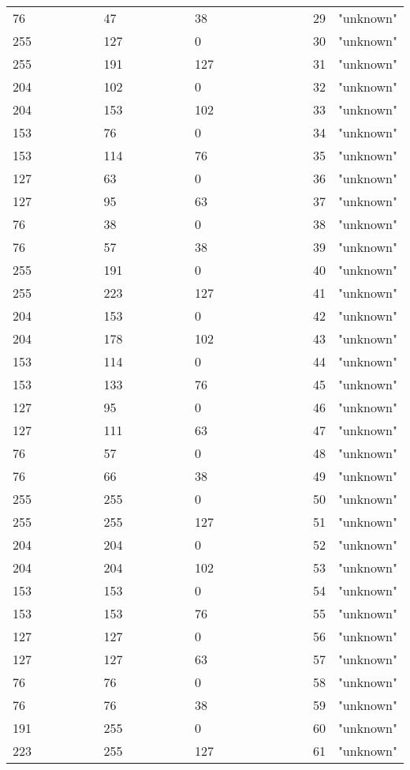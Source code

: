 \begin{longtable}{p{0.3\linewidth} p{0.3\linewidth} p{0.4\linewidth}}
 76 &   47 &   38 &   29 &  "unknown"\\
255 &  127 &    0 &   30 &  "unknown"\\
255 &  191 &  127 &   31 &  "unknown"\\
204 &  102 &    0 &   32 &  "unknown"\\
204 &  153 &  102 &   33 &  "unknown"\\
153 &   76 &    0 &   34 &  "unknown"\\
153 &  114 &   76 &   35 &  "unknown"\\
127 &   63 &    0 &   36 &  "unknown"\\
127 &   95 &   63 &   37 &  "unknown"\\
 76 &   38 &    0 &   38 &  "unknown"\\
 76 &   57 &   38 &   39 &  "unknown"\\
255 &  191 &    0 &   40 &  "unknown"\\
255 &  223 &  127 &   41 &  "unknown"\\
204 &  153 &    0 &   42 &  "unknown"\\
204 &  178 &  102 &   43 &  "unknown"\\
153 &  114 &    0 &   44 &  "unknown"\\
153 &  133 &   76 &   45 &  "unknown"\\
127 &   95 &    0 &   46 &  "unknown"\\
127 &  111 &   63 &   47 &  "unknown"\\
 76 &   57 &    0 &   48 &  "unknown"\\
 76 &   66 &   38 &   49 &  "unknown"\\
255 &  255 &    0 &   50 &  "unknown"\\
255 &  255 &  127 &   51 &  "unknown"\\
204 &  204 &    0 &   52 &  "unknown"\\
204 &  204 &  102 &   53 &  "unknown"\\
153 &  153 &    0 &   54 &  "unknown"\\
153 &  153 &   76 &   55 &  "unknown"\\
127 &  127 &    0 &   56 &  "unknown"\\
127 &  127 &   63 &   57 &  "unknown"\\
 76 &   76 &    0 &   58 &  "unknown"\\
 76 &   76 &   38 &   59 &  "unknown"\\
191 &  255 &    0 &   60 &  "unknown"\\
223 &  255 &  127 &   61 &  "unknown"\\

\end{longtable}
